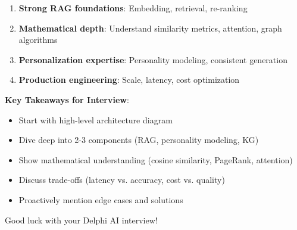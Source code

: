 \documentclass[10pt]{article}
\begin{document}
\begin{enumerate}[leftmargin=*]
    \item \textbf{Strong RAG foundations}: Embedding, retrieval, re-ranking
    \item \textbf{Mathematical depth}: Understand similarity metrics, attention, graph algorithms
    \item \textbf{Personalization expertise}: Personality modeling, consistent generation
    \item \textbf{Production engineering}: Scale, latency, cost optimization
\end{enumerate}

\textbf{Key Takeaways for Interview}:
\begin{itemize}[leftmargin=*]
    \item Start with high-level architecture diagram
    \item Dive deep into 2-3 components (RAG, personality modeling, KG)
    \item Show mathematical understanding (cosine similarity, PageRank, attention)
    \item Discuss trade-offs (latency vs. accuracy, cost vs. quality)
    \item Proactively mention edge cases and solutions
\end{itemize}

Good luck with your Delphi AI interview! 🚀
\end{document}
